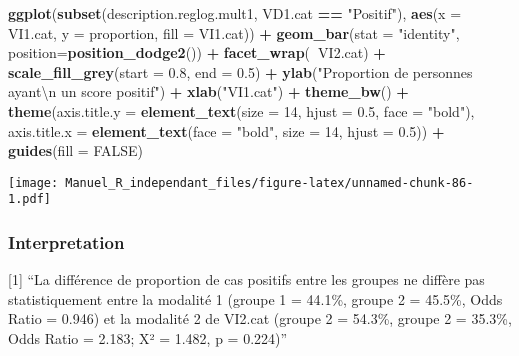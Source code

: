 \documentclass[
]{book}
\newenvironment{Shaded}{\begin{snugshade}}{\end{snugshade}}
\newcommand{\CharTok}[1]{\textcolor[rgb]{0.31,0.60,0.02}{#1}}
\newcommand{\DataTypeTok}[1]{\textcolor[rgb]{0.13,0.29,0.53}{#1}}
\newcommand{\DecValTok}[1]{\textcolor[rgb]{0.00,0.00,0.81}{#1}}
\newcommand{\FloatTok}[1]{\textcolor[rgb]{0.00,0.00,0.81}{#1}}
\newcommand{\KeywordTok}[1]{\textcolor[rgb]{0.13,0.29,0.53}{\textbf{#1}}}
\newcommand{\NormalTok}[1]{#1}
\newcommand{\OperatorTok}[1]{\textcolor[rgb]{0.81,0.36,0.00}{\textbf{#1}}}
\newcommand{\OtherTok}[1]{\textcolor[rgb]{0.56,0.35,0.01}{#1}}
\newcommand{\StringTok}[1]{\textcolor[rgb]{0.31,0.60,0.02}{#1}}
\begin{document}
\begin{Shaded}
\begin{Highlighting}[]
\KeywordTok{ggplot}\NormalTok{(}\KeywordTok{subset}\NormalTok{(description.reglog.mult1, VD1.cat }\OperatorTok{==}\StringTok{ "Positif"}\NormalTok{), }
       \KeywordTok{aes}\NormalTok{(}\DataTypeTok{x =}\NormalTok{ VI1.cat, }\DataTypeTok{y =}\NormalTok{ proportion, }\DataTypeTok{fill =}\NormalTok{ VI1.cat)) }\OperatorTok{+}\StringTok{ }
\StringTok{  }\KeywordTok{geom_bar}\NormalTok{(}\DataTypeTok{stat =} \StringTok{"identity"}\NormalTok{, }\DataTypeTok{position=}\KeywordTok{position_dodge2}\NormalTok{()) }\OperatorTok{+}\StringTok{ }
\StringTok{  }\KeywordTok{facet_wrap}\NormalTok{(}\OperatorTok{~}\NormalTok{VI2.cat) }\OperatorTok{+}\StringTok{ }
\StringTok{  }\KeywordTok{scale_fill_grey}\NormalTok{(}\DataTypeTok{start =} \FloatTok{0.8}\NormalTok{, }\DataTypeTok{end =} \FloatTok{0.5}\NormalTok{) }\OperatorTok{+}
\StringTok{  }\KeywordTok{ylab}\NormalTok{(}\StringTok{"Proportion de personnes ayant}\CharTok{\textbackslash{}n}\StringTok{ un score positif"}\NormalTok{) }\OperatorTok{+}\StringTok{ }\KeywordTok{xlab}\NormalTok{(}\StringTok{"VI1.cat"}\NormalTok{) }\OperatorTok{+}\StringTok{ }
\StringTok{  }\KeywordTok{theme_bw}\NormalTok{() }\OperatorTok{+}\StringTok{ }
\StringTok{  }\KeywordTok{theme}\NormalTok{(}\DataTypeTok{axis.title.y =} \KeywordTok{element_text}\NormalTok{(}\DataTypeTok{size =} \DecValTok{14}\NormalTok{, }\DataTypeTok{hjust =} \FloatTok{0.5}\NormalTok{, }\DataTypeTok{face =} \StringTok{"bold"}\NormalTok{), }
        \DataTypeTok{axis.title.x =} \KeywordTok{element_text}\NormalTok{(}\DataTypeTok{face =} \StringTok{"bold"}\NormalTok{, }\DataTypeTok{size =} \DecValTok{14}\NormalTok{, }\DataTypeTok{hjust =} \FloatTok{0.5}\NormalTok{)) }\OperatorTok{+}
\StringTok{  }\KeywordTok{guides}\NormalTok{(}\DataTypeTok{fill =} \OtherTok{FALSE}\NormalTok{)}
\end{Highlighting}
\end{Shaded}

\texttt{[image: Manuel\_R\_independant\_files/figure-latex/unnamed-chunk-86-1.pdf]}

\hypertarget{interpretation-9}{%
\subsubsection{Interpretation}\label{interpretation-9}}

{[}1{]} ``La différence de proportion de cas positifs entre les groupes ne diffère pas statistiquement entre la modalité 1 (groupe 1 = 44.1\%, groupe 2 = 45.5\%, Odds Ratio = 0.946) et la modalité 2 de VI2.cat (groupe 2 = 54.3\%, groupe 2 = 35.3\%, Odds Ratio = 2.183; X² = 1.482, p = 0.224)''
\end{document}
